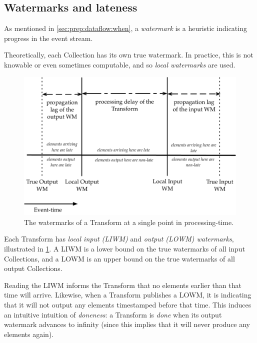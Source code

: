 \subsection{Watermarks and lateness}\label{sec:impl:dataflow:watermarks}\label{sec:impl:dataflow:lateness}

As mentioned in \cref{sec:prep:dataflow:when}, a \emph{watermark} is a heuristic indicating progress in the event stream.

Theoretically, each Collection has its own true watermark.
In practice, this is not knowable or even sometimes computable, and so \emph{local watermarks} are used.

\begin{figure}[t]
	\includegraphics[width=\textwidth]{images/diags/lwm-transform-instantaneous}
	\caption{The watermarks of a Transform at a single point in processing-time.}
	\label{fig:impl:lwm-instantaneous}
\end{figure}

Each Transform has \emph{local input (LIWM)} and \emph{output (LOWM) watermarks}, illustrated in \cref{fig:impl:lwm-instantaneous}.
A LIWM is a lower bound on the true watermarks of all input Collections, and a LOWM is an upper bound on the true watermarks of all output Collections.

Reading the LIWM informs the Transform that no elements earlier than that time will arrive.
Likewise, when a Transform publishes a LOWM, it is indicating that it will not output any elements timestamped before that time. This induces an intuitive intuition of \emph{doneness}: a Transform is \emph{done} when its output watermark advances to infinity (since this implies that it will never produce any elements again).

